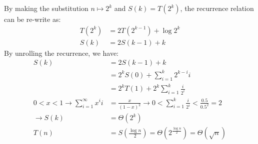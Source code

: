 \documentclass[11pt, a4paper, oneside]{memoir}
\begin{document}
\begin{enumerate}
          By making the substitution $n \mapsto 2^k$ and $S(k) = T(2^k)$, the recurrence relation can be re-write as:
          \begin{align*}
              T(2^k) & = 2T(2^{k-1}) + \log 2^k \\
              S(k)   & = 2S(k-1) + k
          \end{align*}
          By unrolling the recurrence, we have:
          \begin{align*}
              S(k)                                              & = 2S(k-1) + k                                                                            \\
                                                                & = 2^k S(0) + \sum_{i=1}^{k} 2^{k-i} i                                                    \\
                                                                & = 2^k T(1) + 2^k \sum_{i=1}^{k} \frac{i}{2^i}                                            \\
              0 < x < 1 \rightarrow \sum_{i=1}^{\infty} x^{i} i & = \frac{x}{(1-x)^2} \rightarrow 0 < \sum_{i=1}^{k} \frac{i}{2^i} < \frac{0.5}{0.5^2} = 2 \\
              \rightarrow S(k)                                  & = \Theta(2^k)                                                                            \\
              T(n)                                              & = S(\frac{\log n}{2}) = \Theta(2^{\frac{\log n}{2}}) = \Theta(\sqrt{n})
          \end{align*}
\end{enumerate}
\end{document}
